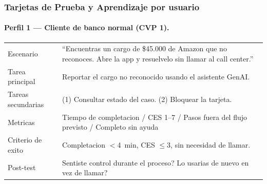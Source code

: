 \documentclass[12pt,a4paper]{article}
\begin{document}
\subsubsection{Tarjetas de Prueba y Aprendizaje por usuario}

\paragraph{Perfil 1 --- Cliente de banco normal (CVP 1).}

\begin{center}
\begin{tabularx}{\linewidth}{L{3.5cm}X}
\toprule
{}
 \\
\midrule
Escenario & ``Encuentras un cargo de \$45.000 de Amazon que no reconoces. Abre
la app y resuelvelo sin llamar al call center.'' \\
Tarea principal & Reportar el cargo no reconocido usando el asistente GenAI. \\
Tareas secundarias & (1) Consultar estado del caso. (2) Bloquear la tarjeta. \\
Metricas & Tiempo de completacion / CES 1--7 / Pasos fuera del flujo previsto / Completo sin ayuda \\
Criterio de exito & Completacion $<$4~min, CES $\leq$3, sin necesidad de llamar. \\
Post-test & Sentiste control durante el proceso? Lo usarias de nuevo en vez de llamar? \\
\bottomrule
\end{tabularx}
\end{center}
\end{document}
